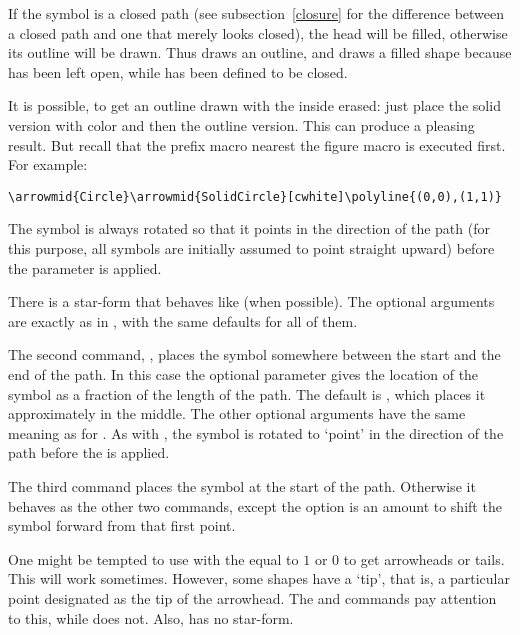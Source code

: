 \documentclass[letterpaper]{article}
\begin{document}
If the symbol is a closed path (see subsection~\ref{closure} for the
difference between a closed path and one that merely looks closed), the
head will be filled, otherwise its outline will be drawn. Thus
 draws an outline, and
 draws a filled shape because
 has been left open, while  has been
defined to be closed.

It is possible, to get an outline drawn with the inside erased:
just place the solid version with color  and then the outline
version. This can produce a pleasing result. But recall that the prefix
macro nearest the figure macro is executed first. For example:
\begin{verbatim}
\arrowmid{Circle}\arrowmid{SolidCircle}[cwhite]\polyline{(0,0),(1,1)}
\end{verbatim}

The symbol is always rotated so that it points in the direction of the
path (for this purpose, all symbols are initially assumed to point
straight upward) before the  parameter is applied.

There is a star-form  that behaves like  (when
possible). The optional arguments are exactly as in , with the
same defaults for all of them.

The second command, , places the symbol somewhere between
the start and the end of the path. In this case the optional parameter
 gives the location of the symbol as a fraction
of the length of the path. The default is , which places it
approximately in the middle. The other optional arguments have the same
meaning as for . As with , the symbol is
rotated to `point' in the direction of the path before the
 is applied.

The third command  places the symbol at the start of the
path. Otherwise it behaves as the other two commands, except the option
 is an amount to shift the symbol forward from
that first point.

One might be tempted to use  with the  equal
to $1$ or $0$ to get arrowheads or tails. This will work sometimes.
However, some shapes have a `tip', that is, a particular point
designated as the tip of the arrowhead. The  and
 commands pay attention to this, while  does
not. Also,  has no star-form.
\end{document}
